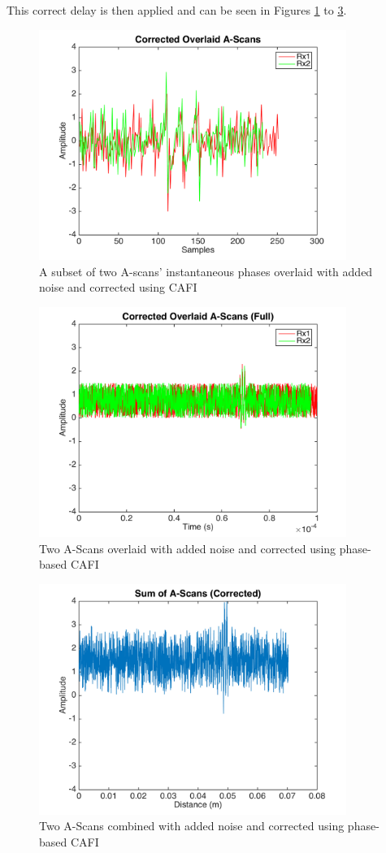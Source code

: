 This correct delay is then applied and can be seen in Figures \ref{fig:cafi_phase6} to \ref{fig:cafi_phase8}.

\begin{figure}[hp]
\centering
		\includegraphics[width=100mm]{Noise_6_Phase.png}
		\caption{A subset of two A-scans' instantaneous phases overlaid with added noise and corrected using CAFI}
		\label{fig:cafi_phase6}
\end{figure}
\begin{figure}[hp]
\centering
		\includegraphics[width=100mm]{Noise_7_Phase.png}
		\caption{Two A-Scans overlaid with added noise and corrected using phase-based CAFI}
		\label{fig:cafi_phase7}
\end{figure}

\begin{figure}[hp]
\centering
		\includegraphics[width=100mm]{Noise_8_Phase.png}
		\caption{Two A-Scans combined with added noise and corrected using phase-based CAFI}
		\label{fig:cafi_phase8}
\end{figure}


